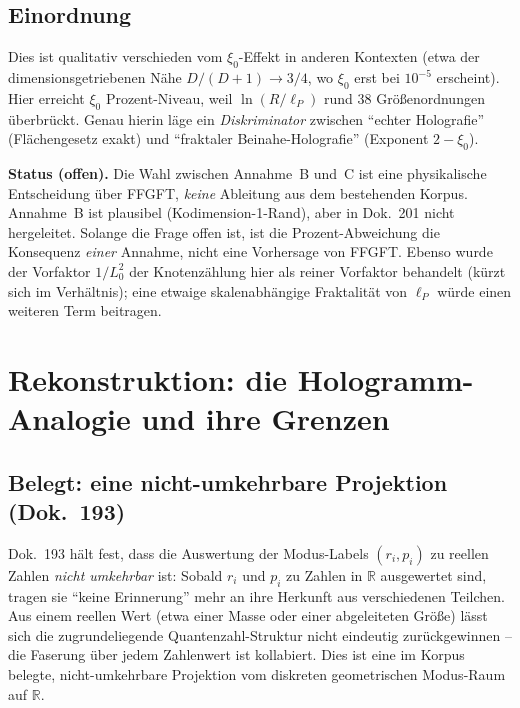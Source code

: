 \subsection*{Einordnung}

Dies ist qualitativ verschieden vom $\xi_0$-Effekt in anderen Kontexten
(etwa der dimensionsgetriebenen Nähe $D/(D+1)\to 3/4$, wo $\xi_0$ erst bei
$10^{-5}$ erscheint). Hier erreicht $\xi_0$ Prozent-Niveau, weil
$\ln(R/\ell_P)$ rund $38$ Größenordnungen überbrückt. Genau hierin läge ein
\emph{Diskriminator} zwischen \enquote{echter Holografie} (Flächengesetz
exakt) und \enquote{fraktaler Beinahe-Holografie} (Exponent $2-\xi_0$).

\medskip

\noindent
\textbf{Status (offen).} Die Wahl zwischen Annahme~B und~C ist eine
physikalische Entscheidung über FFGFT, \emph{keine} Ableitung aus dem
bestehenden Korpus. Annahme~B ist plausibel (Kodimension-1-Rand), aber in
Dok.~201 nicht hergeleitet. Solange die Frage offen ist, ist die
Prozent-Abweichung die Konsequenz \emph{einer} Annahme, nicht eine Vorhersage
von FFGFT. Ebenso wurde der Vorfaktor $1/L_0^2$ der Knotenzählung hier als reiner Vorfaktor
behandelt (kürzt sich im Verhältnis); eine etwaige skalenabhängige
Fraktalität von $\ell_P$ würde einen weiteren Term beitragen.

\section{Rekonstruktion: die Hologramm-Analogie und ihre Grenzen}

\subsection*{Belegt: eine nicht-umkehrbare Projektion (Dok.~193)}

Dok.~193 hält fest, dass die Auswertung der Modus-Labels $(r_i, p_i)$ zu
reellen Zahlen \emph{nicht umkehrbar} ist: Sobald $r_i$ und $p_i$ zu Zahlen
in $\mathbb{R}$ ausgewertet sind, tragen sie \enquote{keine Erinnerung} mehr
an ihre Herkunft aus verschiedenen Teilchen. Aus einem reellen Wert (etwa
einer Masse oder einer abgeleiteten Größe) lässt sich die zugrundeliegende
Quantenzahl-Struktur nicht eindeutig zurückgewinnen -- die Faserung über
jedem Zahlenwert ist kollabiert. Dies ist eine im Korpus belegte,
nicht-umkehrbare Projektion vom diskreten geometrischen Modus-Raum auf
$\mathbb{R}$.

